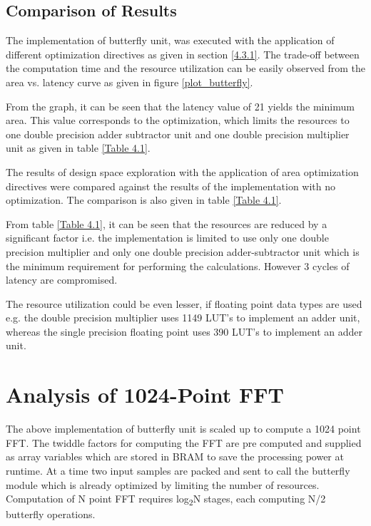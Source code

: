 \subsection{Comparison of Results}
The implementation of butterfly unit, was executed with the application of different optimization directives as given in section \ref{4.3.1}. The trade-off between the computation time and the resource utilization can be easily observed from the area vs. latency curve as given in figure \ref{plot_butterfly}.



From the graph, it can be seen that the latency value of 21 yields the minimum area. This value corresponds to the optimization, which limits the resources to one double precision adder subtractor unit and one double precision multiplier unit as given in table \ref{Table 4.1}. 

The results of design space exploration with the application of area optimization directives were compared against the results of the implementation with no optimization. The comparison is also given in table \ref{Table 4.1}.


From table \ref{Table 4.1}, it can be seen that the resources are reduced by a significant factor i.e. the implementation is limited to use only one double precision multiplier and only one double precision adder-subtractor unit which is the minimum requirement for performing the calculations. However 3 cycles of latency are compromised. 

The resource utilization could be even lesser, if floating point data types are used e.g. the double precision multiplier uses 1149 LUT's to implement an adder unit, whereas the single precision floating point uses 390 LUT's to implement an adder unit.

\section {Analysis of 1024-Point FFT}\label {4.4}
The above implementation of butterfly unit is scaled up to compute a 1024 point FFT. The twiddle factors for computing the FFT are pre computed and supplied as array variables which are stored in BRAM to save the processing power at runtime. At a time two input samples are packed and sent to call the butterfly module which is already optimized by limiting the number of resources. Computation of N point FFT requires log\textsubscript{2}N stages, each computing N/2 butterfly operations.

